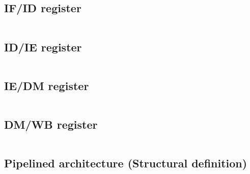 \subsection{IF/ID register}
\begin{code}
\label{code:IF_ID}  
\inputminted[fontsize=\footnotesize]{vhdl}{\srcfolder IF_ID.vhd}
\end{code}

\subsection{ID/IE register}
\begin{code}
\label{code:ID_IE}  
\inputminted[fontsize=\footnotesize]{vhdl}{\srcfolder ID_IE.vhd}
\end{code}

\subsection{IE/DM register}
\begin{code}
\label{code:IE_DM}  
\inputminted[fontsize=\footnotesize]{vhdl}{\srcfolder IE_DM.vhd}
\end{code}

\subsection{DM/WB register}
\begin{code}
\label{code:DM_WB}  
\inputminted[fontsize=\footnotesize]{vhdl}{\srcfolder DM_WB.vhd}
\end{code}

\subsection{Pipelined architecture (Structural definition)}
\begin{code}
\label{code:DTPTH_pipelined}  
\inputminted[fontsize=\footnotesize]{vhdl}{\srcfolder datapath.vhd}
\end{code}
